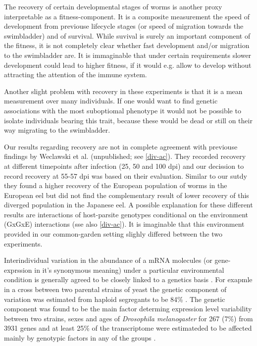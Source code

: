 The recovery of certain developmental stages of worms is another proxy
interpretable as a fitness-component. It is a composite measurement
the speed of development from previouse lifecycle stages (or speed of
migration towards the swimbladder) and of survival. While suvival is
surely an important component of the fitness, it is not completely
clear whether fast development and/or migration to the swimbladder
are. It is immaginable that under certain requirements slower
development could lead to higher fitness, if it would e.g. allow to
develop without attracting the attention of the immune system.

Another slight problem with recovery in these experiments is that it
is a mean measurement over many individuals. If one would want to find
genetic associations with the most suboptiomal phenotype it would not
be possible to isolate individuals bearing this trait, because these
would be dead or still on their way migrating to the swimbladder.

Our results regarding recovery are not in complete agreement with
previouse findings by Weclawski et al. (unpublished; see
\ref{div-ac}). They recorded recovery at different timepoints after
infection (25, 50 and 100 dpi) and our decission to record recovery at
55-57 dpi was based on their evaluation.  Similar to our sutdy they
found a higher recovery of the European population of worms in the
European eel but did not find the complementary result of lower
recovery of this diverged population in the Japanese eel. A possible
explanation for these different results are interactions of
host-parsite genotypes conditional on the environment (GxGxE)
interactions (sse also \ref{div-ac}). It is imaginable that this
environment provided in our common-garden setting slighly differed
between the two experiments.

Interindividual variation in the abundance of a mRNA molecules (or
gene-exprssion in it's synonymous meaning) under a particular
environmental condition is generally agreed to be closely linked to a
genetics basis \cite{pmid15498452}. For exapmle in a cross between two
parental strains of yeast the genetic component of variation was
estimated from haploid segregants to be 84\% \cite{pmid11923494}. The
genetic component was found to be the main factor determing expression
level variability between two strains, sexes and ages of
\textit{Drosophila melanogaster} for 267 (7\%) from 3931 genes and at
least 25\% of the transcriptome were estimateded to be affected mainly
by genotypic factors in any of the groups \cite{pmid11726925}.

